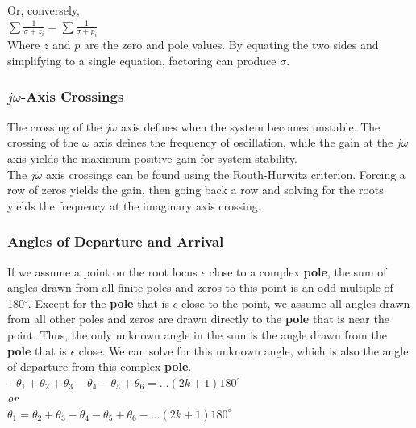 \documentclass[11pt]{article}
\begin{document}
    Or, conversely, \\

    $\sum \frac{1}{\sigma + z_i} = \sum \frac{1}{\sigma + p_i}$ \\

    Where $z$ and $p$ are the zero and pole values. By equating the two sides and simplifying to a single equation, factoring can produce $\sigma$.

    \subsubsection{$j\omega$-Axis Crossings}

    The crossing of the $j\omega$ axis defines when the system becomes unstable. The crossing of the $\omega$ axis deines the frequency of oscillation, while the gain at the $j\omega$ axis yields the maximum positive gain for system stability. \\ 

    The $j\omega$ axis crossings can be found using the Routh-Hurwitz criterion. Forcing a row of zeros yields the gain, then going back a row and solving for the roots yields the frequency at the imaginary axis crossing.

    \subsubsection{Angles of Departure and Arrival}

    If we assume a point on the root locus $\epsilon$ close to a complex \textbf{pole}, the sum of angles drawn from all finite poles and zeros to this point is an odd multiple of 180$^\circ$. Except for the \textbf{pole} that is $\epsilon$ close to the point, we assume all angles drawn from all other poles and zeros are drawn directly to the \textbf{pole} that is near the point. Thus, the only unknown angle in the sum is the angle drawn from the \textbf{pole} that is $\epsilon$ close. We can solve for this unknown angle, which is also the angle of departure from this complex \textbf{pole}. \\

    $-\theta_1 + \theta_2 + \theta_3 - \theta_4 - \theta_5 + \theta_6 =(2k+1)180^\circ$ \\ 
    
    \textit{or} \\ 

    $\theta_1 = \theta_2 + \theta_3 - \theta_4 - \theta_5 + \theta_6 -(2k+1)180^\circ$ \\
\end{document}
